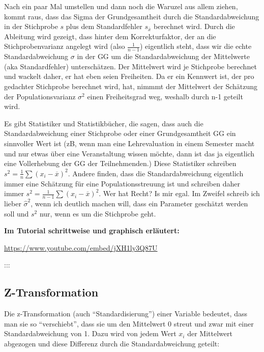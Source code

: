 \documentclass[
  10pt,
  letterpaper,
  a4paper, twoside]{scrreprt}
\begin{document}
\begin{tcolorbox}
Nach ein paar Mal umstellen und dann noch die Waruzel aus allem ziehen,
kommt raus, dass das Sigma der Grundgesamtheit durch die
Standardabweichung in der Stichprobe \(s\) plus dem Standardfehler
\(s_{\bar{x}}\) berechnet wird. Durch die Ableitung wird gezeigt, dass
hinter dem Korrekturfaktor, der an die Stichprobenvarianz angelegt wird
(also \(\frac{1}{n-1}\)) eigentlich steht, dass wir die echte
Standardabweichung \(\sigma\) in der GG um die Standardabweichung der
Mittelwerte (aka Standardfehler) unterschätzen. Der Mittelwert wird je
Stichprobe berechnet und wackelt daher, er hat eben seien Freiheiten. Da
er ein Kennwert ist, der pro gedachter Stichprobe berechnet wird, hat,
nimmmt der Mittelwert der Schätzung der Populationsvarianz \(\sigma^2\)
einen Freiheitsgrad weg, weshalb durch n-1 geteilt wird.

Es gibt Statistiker und Statistikbücher, die sagen, dass auch die
Standardabweichung einer Stichprobe oder einer Grundgesamtheit GG ein
sinnvoller Wert ist (zB, wenn man eine Lehrevaluation in einem Semester
macht und nur etwas über eine Veranstaltung wissen möchte, dann ist das
ja eigentlich eine Vollerhebung der GG der Teilnehmenden.) Diese
Statistiker schreiben \(s^2 = \frac{1}{n}\sum(x_i-\overline{x})^2\).
Andere finden, dass die Standardabweichung eigentlich immer eine
Schätzung für eine Populationsstreuung ist und schreiben daher immer
\(s^2 = \frac{1}{n-1}\sum(x_i-\overline{x})^2\). Wer hat Recht? Is mir
egal. Im Zweifel schreib ich lieber \(\hat{\sigma}^2\), wenn ich
deutlich machen will, dass ein Parameter geschätzt werden soll und
\(s^2\) nur, wenn es um die Stichprobe geht.

\textbf{Im Tutorial schrittweise und graphisch erläutert:}

\url{https://www.youtube.com/embed/jXH1ly3Q87U}

\end{tcolorbox}

:::

\subsection{Z-Transformation}\label{z-transformation}

Die z-Transformation (auch \enquote{Standardisierung}) einer Variable
bedeutet, dass man sie so \enquote{verschiebt}, dass sie um den
Mittelwert 0 streut und zwar mit einer Standardabweichung von 1. Dazu
wird von jedem Wert \(x_i\) der Mittelwert abgezogen und diese Differenz
durch die Standardabweichung geteilt:
\end{document}
